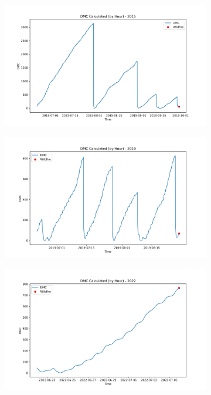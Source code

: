 \begin{figure}[h]
	\centering
	\caption{Calculated hourly DMC value for 2015, 2019, and 2022}
	\begin{subfigure}{0.45\textwidth}
		\centering
		\includegraphics[width=\textwidth]{graphs/2015/byHour/2015CalcDMC12.png}
	\end{subfigure}
	\hfill
	\begin{subfigure}{0.45\textwidth}
		\centering
		\includegraphics[width=\textwidth]{graphs/2019/2019CalcDMC12.png}
	\end{subfigure}
	\hfill
	\begin{subfigure}{0.45\textwidth}
		\centering
		\includegraphics[width=\textwidth]{graphs/2022/2022CalcDMC12.png}
	\end{subfigure}
	
	\label{fig:hourly_dmc}
\end{figure}

